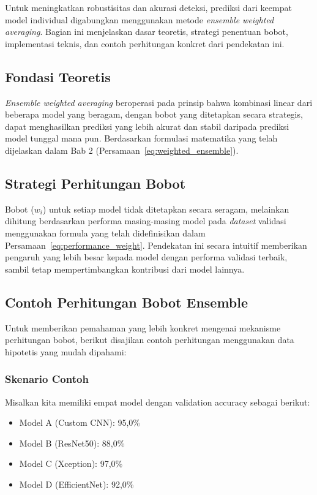 Untuk meningkatkan robustisitas dan akurasi deteksi, prediksi dari keempat model individual digabungkan menggunakan metode \textit{ensemble weighted averaging}. Bagian ini menjelaskan dasar teoretis, strategi penentuan bobot, implementasi teknis, dan contoh perhitungan konkret dari pendekatan ini.

\subsection{Fondasi Teoretis}

\textit{Ensemble weighted averaging} beroperasi pada prinsip bahwa kombinasi linear dari beberapa model yang beragam, dengan bobot yang ditetapkan secara strategis, dapat menghasilkan prediksi yang lebih akurat dan stabil daripada prediksi model tunggal mana pun. Berdasarkan formulasi matematika yang telah dijelaskan dalam Bab 2 (Persamaan~\ref{eq:weighted_ensemble}).

\subsection{Strategi Perhitungan Bobot}

Bobot ($w_i$) untuk setiap model tidak ditetapkan secara seragam, melainkan dihitung berdasarkan performa masing-masing model pada \textit{dataset} validasi menggunakan formula yang telah didefinisikan dalam Persamaan~\ref{eq:performance_weight}. Pendekatan ini secara intuitif memberikan pengaruh yang lebih besar kepada model dengan performa validasi terbaik, sambil tetap mempertimbangkan kontribusi dari model lainnya.

\subsection{Contoh Perhitungan Bobot Ensemble}

Untuk memberikan pemahaman yang lebih konkret mengenai mekanisme perhitungan bobot, berikut disajikan contoh perhitungan menggunakan data hipotetis yang mudah dipahami:

\subsubsection{Skenario Contoh}
Misalkan kita memiliki empat model dengan validation accuracy sebagai berikut:
\begin{itemize}
    \item Model A (Custom CNN): 95,0\%
    \item Model B (ResNet50): 88,0\%
    \item Model C (Xception): 97,0\%
    \item Model D (EfficientNet): 92,0\%
\end{itemize}

